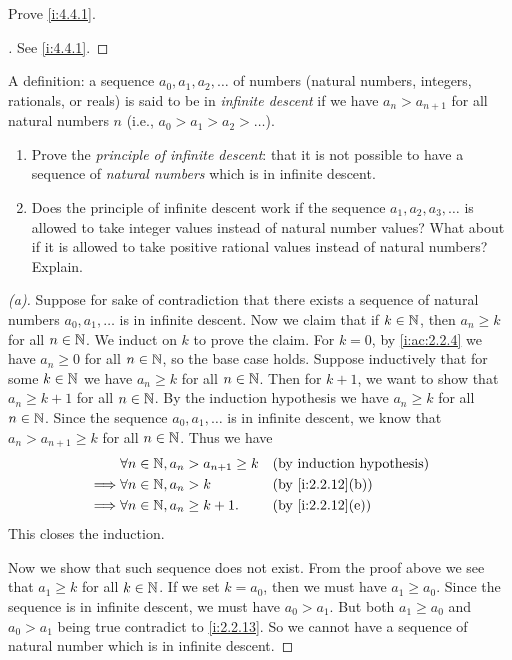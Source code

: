 \exercisesection

\begin{ex}\label{i:ex:4.4.1}
  Prove \cref{i:4.4.1}.
\end{ex}

\begin{proof}[]
  See \cref{i:4.4.1}.
\end{proof}

\begin{ex}\label{i:ex:4.4.2}
  A definition: a sequence \(a_0, a_1, a_2, \dots\) of numbers (natural numbers, integers, rationals, or reals) is said to be in \emph{infinite descent} if we have \(a_n > a_{n + 1}\) for all natural numbers \(n\)
  (i.e., \(a_0 > a_1 > a_2 > \dots\)).
  \begin{enumerate}
    \item Prove the \emph{principle of infinite descent}:
          that it is not possible to have a sequence of \emph{natural numbers} which is in infinite descent.
    \item Does the principle of infinite descent work if the sequence \(a_1, a_2, a_3, \dots\) is allowed to take integer values instead of natural number values?
          What about if it is allowed to take positive rational values instead of natural numbers?
          Explain.
  \end{enumerate}
\end{ex}

\begin{proof}[(a)]
  Suppose for sake of contradiction that there exists a sequence of natural numbers \(a_0, a_1, \dots\) is in infinite descent.
  Now we claim that if \(k \in \mathbb{N}\), then \(a_n \geq k\) for all \(n \in \mathbb{N}\).
  We induct on \(k\) to prove the claim.
  For \(k = 0\), by \cref{i:ac:2.2.4} we have \(a_n \geq 0\) for all \(n \in \mathbb{N}\), so the base case holds.
  Suppose inductively that for some \(k \in \mathbb{N}\) we have \(a_n \geq k\) for all \(n \in \mathbb{N}\).
  Then for \(k + 1\), we want to show that \(a_n \geq k + 1\) for all \(n \in \mathbb{N}\).
  By the induction hypothesis we have \(a_n \geq k\) for all \(n \in \mathbb{N}\).
  Since the sequence \(a_0, a_1, \dots\) is in infinite descent, we know that \(a_n > a_{n + 1} \geq k\) for all \(n \in \mathbb{N}\).
  Thus we have
  \begin{align*}
             & \forall n \in \N, a_n > a_{n + 1} \geq k &  & \byIH            \\
    \implies & \forall n \in \N, a_n > k                &  & \by{i:2.2.12}[b] \\
    \implies & \forall n \in \N, a_n \geq k + 1.        &  & \by{i:2.2.12}[e]
  \end{align*}
  This closes the induction.

  Now we show that such sequence does not exist.
  From the proof above we see that \(a_1 \geq k\) for all \(k \in \mathbb{N}\).
  If we set \(k = a_0\), then we must have \(a_1 \geq a_0\).
  Since the sequence is in infinite descent, we must have \(a_0 > a_1\).
  But both \(a_1 \geq a_0\) and \(a_0 > a_1\) being true contradict to \cref{i:2.2.13}.
  So we cannot have a sequence of natural number which is in infinite descent.
\end{proof}

